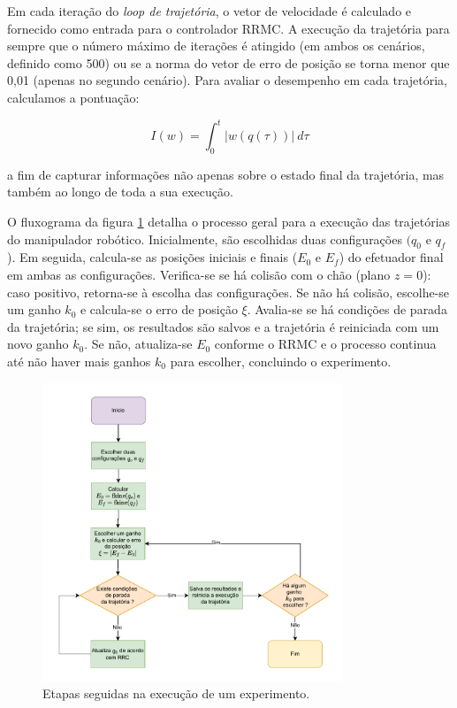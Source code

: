 Em cada iteração do \emph{loop de trajetória}, o vetor de velocidade é calculado e 
fornecido como entrada para o controlador RRMC. A execução da trajetória para sempre 
que o número máximo de iterações é atingido (em ambos os cenários, definido como 500) ou 
se a norma do vetor de erro de posição se torna menor que 0,01 (apenas no segundo cenário). 
Para avaliar o desempenho em cada trajetória, calculamos a pontuação:

\begin{equation}
	I(w) = \int_0^t {|w(q(\tau))| \ d\tau}
\end{equation}
	
a fim de capturar informações não apenas sobre o estado final da trajetória, mas também ao 
longo de toda a sua execução.

O fluxograma da figura \ref*{fig:exp-flow} detalha o processo geral para a execução das 
trajetórias do manipulador robótico. Inicialmente, são escolhidas duas configurações 
\((q_0\) e \(q_f\)). Em seguida, calcula-se as posições iniciais e finais (\(E_0\) e 
\(E_f\)) do efetuador final em ambas as configurações. Verifica-se se há colisão com 
o chão (plano $z=0$): caso positivo, retorna-se à escolha das configurações. Se não há 
colisão, escolhe-se um ganho \(k_0\) e calcula-se o erro de posição \(\xi\). Avalia-se 
se há condições de parada da trajetória; se sim, os resultados são salvos e a trajetória 
é reiniciada com um novo ganho \(k_0\). Se não, atualiza-se \(E_0\) conforme o RRMC
e o processo continua até não haver mais ganhos \(k_0\) para escolher, concluindo o 
experimento.

\begin{figure}
	\centering
	\includegraphics[width=0.8\textwidth]{./Images/exp-flow.pdf}
	\caption{Etapas seguidas na execução de um experimento.}\label{fig:exp-flow}
\end{figure}

